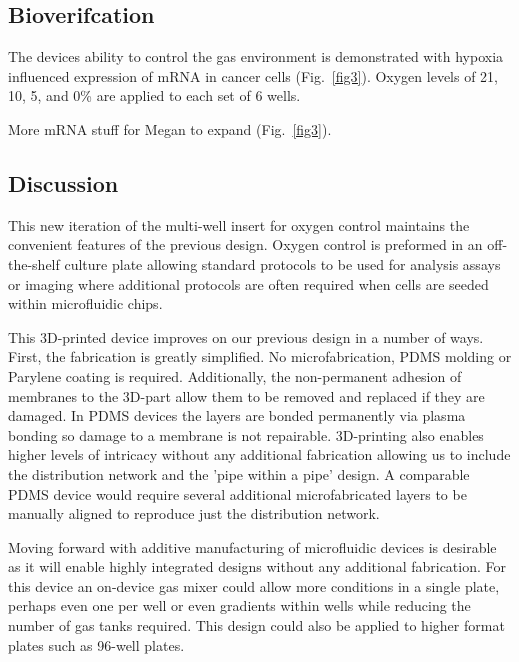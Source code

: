\documentclass[10pt,letterpaper]{article}
\begin{document}
\subsection*{Bioverifcation}
The devices ability to control the gas environment is demonstrated with hypoxia influenced expression of mRNA in cancer cells (Fig.~\ref{fig3}).
Oxygen levels of 21, 10, 5, and 0\% are applied to each set of 6 wells. 

More mRNA stuff for Megan to expand (Fig.~\ref{fig3}).

\subsection*{Discussion}
This new iteration of the multi-well insert for oxygen control maintains the convenient features of the previous design.
Oxygen control is preformed in an off-the-shelf culture plate allowing standard protocols to be used for analysis assays or imaging where additional protocols are often required when cells are seeded within microfluidic chips.

This 3D-printed device improves on our previous design in a number of ways.
First, the fabrication is greatly simplified. 
No microfabrication, PDMS molding or Parylene coating is required.
Additionally, the non-permanent adhesion of membranes to the 3D-part allow them to be removed and replaced if they are damaged.
In PDMS devices the layers are bonded permanently via plasma bonding so damage to a membrane is not repairable.
3D-printing also enables higher levels of intricacy without any additional fabrication allowing us to include the distribution network and the 'pipe within a pipe' design. 
A comparable PDMS device would require several additional microfabricated layers to be manually aligned to reproduce just the distribution network.

Moving forward with additive manufacturing of microfluidic devices is desirable as it will enable highly integrated designs without any additional fabrication.
For this device an on-device gas mixer could allow more conditions in a single plate, perhaps even one per well or even gradients within wells while reducing the number of gas tanks required.
This design could also be applied to higher format plates such as 96-well plates.
\end{document}
